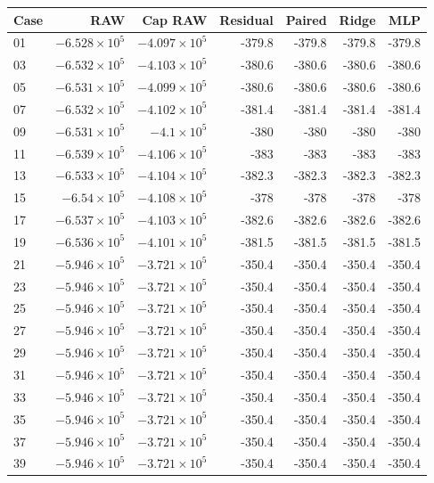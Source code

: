 \begin{tabular}{lrrrrrr}
\toprule
Case & RAW & Cap RAW & Residual & Paired & Ridge & MLP \\
\midrule
01 & \(-6.528\times10^{5}\) & \(-4.097\times10^{5}\) & -379.8 & -379.8 & -379.8 & -379.8 \\
03 & \(-6.532\times10^{5}\) & \(-4.103\times10^{5}\) & -380.6 & -380.6 & -380.6 & -380.6 \\
05 & \(-6.531\times10^{5}\) & \(-4.099\times10^{5}\) & -380.6 & -380.6 & -380.6 & -380.6 \\
07 & \(-6.532\times10^{5}\) & \(-4.102\times10^{5}\) & -381.4 & -381.4 & -381.4 & -381.4 \\
09 & \(-6.531\times10^{5}\) & \(-4.1\times10^{5}\) & -380 & -380 & -380 & -380 \\
11 & \(-6.539\times10^{5}\) & \(-4.106\times10^{5}\) & -383 & -383 & -383 & -383 \\
13 & \(-6.533\times10^{5}\) & \(-4.104\times10^{5}\) & -382.3 & -382.3 & -382.3 & -382.3 \\
15 & \(-6.54\times10^{5}\) & \(-4.108\times10^{5}\) & -378 & -378 & -378 & -378 \\
17 & \(-6.537\times10^{5}\) & \(-4.103\times10^{5}\) & -382.6 & -382.6 & -382.6 & -382.6 \\
19 & \(-6.536\times10^{5}\) & \(-4.101\times10^{5}\) & -381.5 & -381.5 & -381.5 & -381.5 \\
21 & \(-5.946\times10^{5}\) & \(-3.721\times10^{5}\) & -350.4 & -350.4 & -350.4 & -350.4 \\
23 & \(-5.946\times10^{5}\) & \(-3.721\times10^{5}\) & -350.4 & -350.4 & -350.4 & -350.4 \\
25 & \(-5.946\times10^{5}\) & \(-3.721\times10^{5}\) & -350.4 & -350.4 & -350.4 & -350.4 \\
27 & \(-5.946\times10^{5}\) & \(-3.721\times10^{5}\) & -350.4 & -350.4 & -350.4 & -350.4 \\
29 & \(-5.946\times10^{5}\) & \(-3.721\times10^{5}\) & -350.4 & -350.4 & -350.4 & -350.4 \\
31 & \(-5.946\times10^{5}\) & \(-3.721\times10^{5}\) & -350.4 & -350.4 & -350.4 & -350.4 \\
33 & \(-5.946\times10^{5}\) & \(-3.721\times10^{5}\) & -350.4 & -350.4 & -350.4 & -350.4 \\
35 & \(-5.946\times10^{5}\) & \(-3.721\times10^{5}\) & -350.4 & -350.4 & -350.4 & -350.4 \\
37 & \(-5.946\times10^{5}\) & \(-3.721\times10^{5}\) & -350.4 & -350.4 & -350.4 & -350.4 \\
39 & \(-5.946\times10^{5}\) & \(-3.721\times10^{5}\) & -350.4 & -350.4 & -350.4 & -350.4 \\
\bottomrule
\end{tabular}

